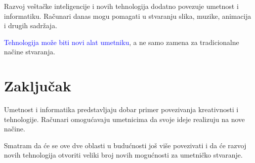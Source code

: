 \documentclass[a4paper,12pt]{article}
\begin{document}
Razvoj veštačke inteligencije i novih tehnologija dodatno
povezuje umetnost i informatiku. Računari danas mogu pomagati
u stvaranju slika, muzike, animacija i drugih sadržaja.

\textcolor{blue}{Tehnologija može biti novi alat umetniku},
a ne samo zamena za tradicionalne načine stvaranja.

\section{Zaključak}

Umetnost i informatika predstavljaju dobar primer povezivanja
kreativnosti i tehnologije. Računari omogućavaju umetnicima
da svoje ideje realizuju na nove načine.

Smatram da će se ove dve oblasti u budućnosti još više
povezivati i da će razvoj novih tehnologija otvoriti veliki
broj novih mogućnosti za umetničko stvaranje.
\end{document}
